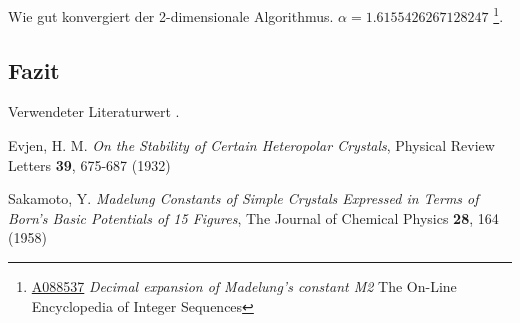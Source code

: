 \documentclass[10pt,a4paper]{article}
\begin{document}
Wie gut konvergiert der 2-dimensionale Algorithmus.
$\alpha = 1.6155426267128247$ \footnote{\href{https://oeis.org/A088537}{A088537} \emph{Decimal expansion of Madelung's constant M2} The On-Line Encyclopedia of Integer Sequences}.

\subsection{Fazit}

Verwendeter Literaturwert  .


\begin{thebibliography}{9}

Evjen, H. M.
\emph{On the Stability of Certain Heteropolar Crystals},
Physical Review Letters \textbf{39},
675-687 (1932)

Sakamoto, Y.
\emph{Madelung Constants of Simple Crystals Expressed in Terms of Born's Basic
Potentials of 15 Figures},
The Journal of Chemical Physics \textbf{28},
164 (1958)

\end{thebibliography}
\end{document}
